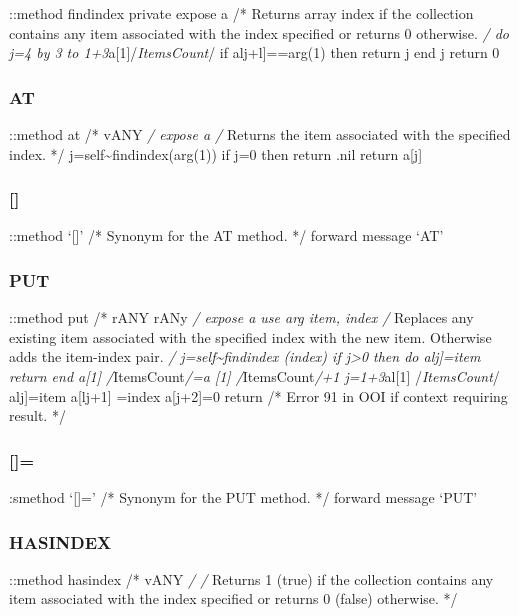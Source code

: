 ::method findindex private expose a /* Returns array index if the
collection contains any item associated with the index specified or
returns 0 otherwise. \emph{/ do j=4 by 3 to
1+3}a{[}1{]}/\emph{ItemsCount}/ if alj+l{]}==arg(1) then return j end j
return 0

\subsubsection{AT}\label{at}

::method at /* vANY \emph{/ expose a /} Returns the item associated with
the specified index. */ j=self\textasciitilde findindex(arg(1)) if j=0
then return .nil return a{[}j{]}

\subsubsection{{[}{]}}\label{section}

::method `{[}{]}' /* Synonym for the AT method. */ forward message `AT'

\subsubsection{PUT}\label{put}

::method put /* rANY rANy \emph{/ expose a use arg item, index /}
Replaces any existing item associated with the specified index with the
new item. Otherwise adds the item-index pair. \emph{/
j=self\textasciitilde findindex (index) if j\textgreater0 then do
alj{]}=item return end a{[}1{]} /}ItemsCount\emph{/=a {[}1{]}
/}ItemsCount\emph{/+1 j=1+3}al{[}1{]} /\emph{ItemsCount}/ alj{]}=item
a{[}lj+1{]} =index a{[}j+2{]}=0 return /* Error 91 in OOI if context
requiring result. */

\subsubsection{{[}{]}=}\label{section-1}

:smethod `{[}{]}=' /* Synonym for the PUT method. */ forward message
`PUT'

\subsubsection{HASINDEX}\label{hasindex}

::method hasindex /* vANY \emph{/ /} Returns 1 (true) if the collection
contains any item associated with the index specified or returns 0
(false) otherwise. */

